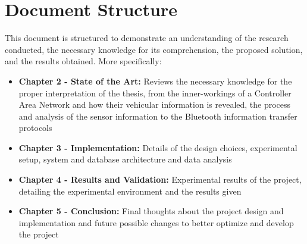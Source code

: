 \section{Document Structure}

This document is structured to demonstrate an understanding of the research conducted, the necessary knowledge for its comprehension, the proposed solution, and the results obtained. More specifically:

\begin{itemize}
    \item \textbf{Chapter 2 - State of the Art:} Reviews the necessary knowledge for the proper interpretation of the thesis, from the inner-workings of a Controller Area Network and how their vehicular information is revealed, the process and analysis of the sensor information to the Bluetooth information transfer protocols
    \item \textbf{Chapter 3 - Implementation:} Details of the design choices, experimental setup, system and database architecture and data analysis 
    \item \textbf{Chapter 4 - Results and Validation:} Experimental results of the project, detailing the experimental environment and the results given
    \item \textbf{Chapter 5 - Conclusion:} Final thoughts about the project design and implementation and future possible changes to better optimize and develop the project
\end{itemize}


